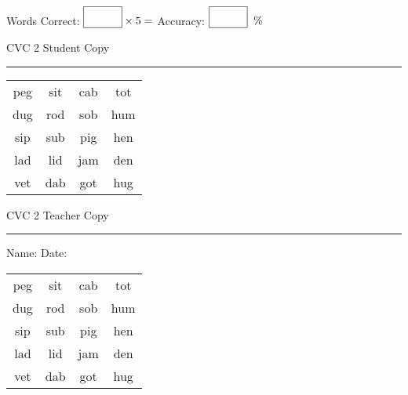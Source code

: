 \documentclass{memoir}
\begin{document}
\normalsize

Words Correct: $\fbox{\phantom{\huge 100}} \times 5 = $ Accuracy: $\fbox{\phantom{\huge 100}}\;\; \%$ 

\vfill

\newpage


\footnotesize \noindent
CVC 2 \hfill Student Copy
\smallskip
\hrule

\huge

\setlength{\tabcolsep}{14pt}
\def\arraystretch{2}

{\selectfont


\begin{vplace}[0.5]
\begin{center}
\begin{tabular}{cccc}
peg & sit & cab & tot \\
dug & rod & sob & hum \\
sip & sub & pig & hen \\
lad & lid & jam & den \\
vet & dab & got & hug \\
\end{tabular}
\end{center}
\end{vplace}

}

\newpage

\footnotesize \noindent
CVC 2 \hfill Teacher Copy
\smallskip
\hrule

\normalsize

\vfill

\noindent
Name: \underline{\hspace{1.75in}} \hfill Date: \underline{\hspace{1in}}

\huge

{\selectfont


\begin{vplace}[0.5]
\begin{center}
\begin{tabular}{cccc}
peg & sit & cab & tot \\
dug & rod & sob & hum \\
sip & sub & pig & hen \\
lad & lid & jam & den \\
vet & dab & got & hug \\
\end{tabular}
\end{center}
\end{vplace}



}
\end{document}
